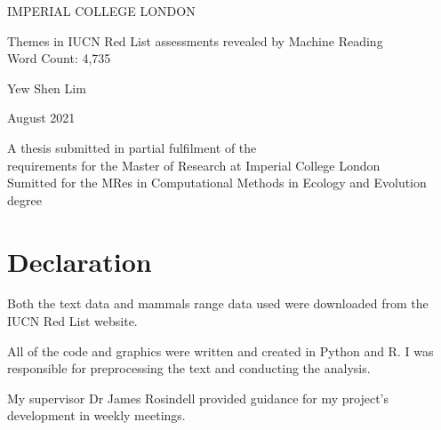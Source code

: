 \documentclass[a4paper, 11pt]{article}
\begin{document}
	\begin{center}
		{\large IMPERIAL COLLEGE LONDON}
	\end{center}
	\vspace{6cm}
	
	\begin{center}
		
		\Huge Themes in IUCN Red List assessments revealed by Machine Reading\\		
		\vspace{.5cm}		
		\large {Word Count: 4,735}
		
	\end{center}
	\vspace{2.5cm}
	\begin{center}
		\Large Yew Shen Lim
	\end{center}
	
	\begin{center}
		{\large August 2021}
	\end{center}

	\vspace{7cm}
	\begin{center}
		{\large A thesis submitted in partial fulfilment of the \\requirements for the Master of Research at Imperial College London \\ Sumitted for the MRes in Computational Methods in Ecology and Evolution degree}
	\end{center}		

	\newpage

\section*{Declaration}

Both the text data and mammals range data used were downloaded from the IUCN Red List website.

All of the code and graphics were written and created in Python and R. I was responsible for preprocessing the text and conducting the analysis.

My supervisor Dr James Rosindell provided guidance for my project's development in weekly meetings.

\pagebreak

\end{document}
